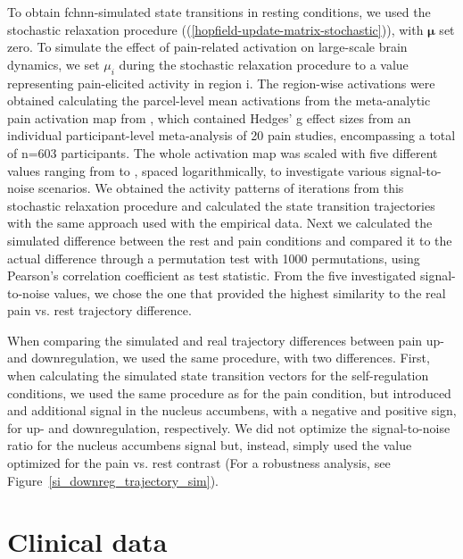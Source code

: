 \documentclass{article}
\begin{document}
To obtain \acrshort{fchnn}-simulated state transitions in resting conditions, we used the stochastic relaxation procedure ((\ref{hopfield-update-matrix-stochastic})), with $\mathbf{\mu}$ set zero.
To simulate the effect of pain-related activation on large-scale brain dynamics, we set $\mu_i$ during the stochastic relaxation procedure to a value representing pain-elicited activity in region i. The region-wise activations were obtained calculating the parcel-level mean activations from the meta-analytic pain activation map from \citep{zunhammer2021meta}, which contained Hedges' g effect sizes from an individual participant-level meta-analysis of 20 pain studies, encompassing a total of n=603 participants. The whole activation map was scaled with five different values ranging from  to , spaced logarithmically, to investigate various signal-to-noise scenarios.
We obtained the activity patterns of  iterations from this stochastic relaxation procedure and calculated the state transition trajectories with the same approach used with the empirical data.
Next we calculated the simulated difference between the rest and pain conditions and compared it to the actual difference through a permutation test with 1000 permutations, using Pearson's correlation coefficient as test statistic.
From the five investigated signal-to-noise values, we chose the one that provided the highest similarity to the real pain vs. rest trajectory difference.

When comparing the simulated and real trajectory differences between pain up- and downregulation, we used the same procedure, with two differences. First, when calculating the simulated state transition vectors for the self-regulation conditions, we used the same procedure as for the pain condition, but introduced and additional signal in the nucleus accumbens, with a negative and positive sign, for  up- and downregulation, respectively. We did not optimize the signal-to-noise ratio for the nucleus accumbens signal but, instead, simply used the value optimized for the pain vs. rest contrast (For a robustness analysis, see Figure~\ref{si_downreg_trajectory_sim}).

\section{Clinical data}
\end{document}
